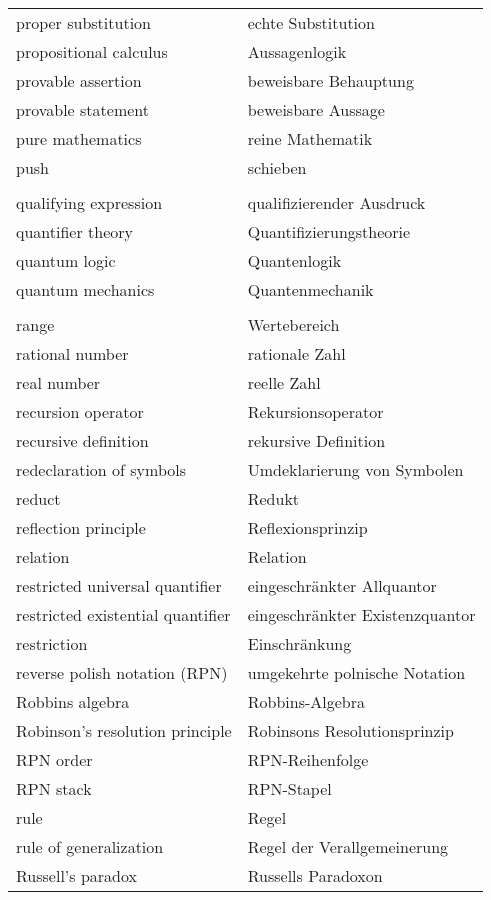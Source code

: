 \begin{longtabu}   { @{} X[l] X[l] }
    proper substitution & echte Substitution \\
    propositional calculus & Aussagenlogik \\
    provable assertion & beweisbare Behauptung \\
    provable statement & beweisbare Aussage \\
    pure mathematics & reine Mathematik \\
    push & schieben \\
     & \\
    qualifying expression & qualifizierender Ausdruck \\
    quantifier theory & Quantifizierungstheorie \\
    quantum logic & Quantenlogik \\
    quantum mechanics & Quantenmechanik \\
     & \\
    range & Wertebereich \\
    rational number & rationale Zahl \\
    real number & reelle Zahl \\
    recursion operator & Rekursionsoperator \\
    recursive definition & rekursive Definition \\
    redeclaration of symbols & Umdeklarierung von Symbolen \\
    reduct & Redukt \\
    reflection principle & Reflexionsprinzip \\
    relation & Relation \\
    restricted universal quantifier & eingeschränkter Allquantor \\
    restricted existential quantifier & eingeschränkter Existenzquantor \\
    restriction & Einschränkung \\
    reverse polish notation (RPN) & umgekehrte polnische Notation \\
    Robbins algebra & Robbins-Algebra \\
    Robinson's resolution principle & Robinsons Resolutionsprinzip \\
    RPN order & RPN-Reihenfolge \\
    RPN stack & RPN-Stapel \\
    rule & Regel \\
    rule of generalization & Regel der Verallgemeinerung \\
    Russell's paradox & Russells Paradoxon \\

\end{longtabu}

